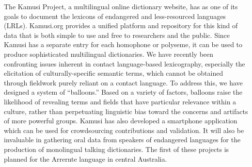 The Kamusi Project, a multilingual online dictionary website, has as one of its goals to document the lexicons of endangered and less-resourced languages (LRLs). Kamusi.org provides a unified platform and repository for this kind of data that is both simple to use and free to researchers and the public. Since Kamusi has a separate entry for each homophone or polyseme, it can be used to produce sophisticated multilingual dictionaries. We have recently been confronting issues inherent in contact language-based lexicography, especially the elicitation of culturally-specific semantic terms, which cannot be obtained through fieldwork purely reliant on a contact language. To address this, we have designed a system of ``balloons.'' Based on a variety of factors, balloons raise the likelihood of revealing terms and fields that have particular relevance within a culture, rather than perpetuating linguistic bias toward the concerns and artifacts of more powerful groups. Kamusi has also developed a smartphone application which can be used for crowdsourcing contributions and validation.  It will also be invaluable in gathering oral data from speakers of endangered languages for the production of monolingual talking dictionaries. The first of these projects is planned for the Arrernte language in central Australia.
